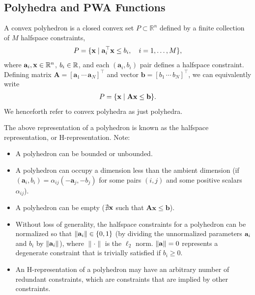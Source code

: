 \subsection{Polyhedra and PWA Functions}
\begin{definition}
A convex polyhedron is a closed convex set $P \subset \mathbb{R}^n$ defined by a finite collection of $M$ halfspace constraints,
\[
P = \{\mathbf{x} \mid \mathbf{a}_i^\top \mathbf{x} \le b_i, \quad i = 1, \ldots, M\},
\]
where $\mathbf{a}_i,\mathbf{x} \in \mathbb{R}^n$, $b_i \in \mathbb{R}$, and each $(\mathbf{a}_i, b_i)$ pair defines a halfspace constraint. Defining matrix $\mathbf{A} = [\mathbf{a}_1 \, \cdots \, \mathbf{a}_N]^\top$ and vector $\mathbf{b} = [b_1 \, \cdots \, b_N]^\top$, we can equivalently write
\begin{align*}
    P = \{\mathbf{x} \mid \mathbf{Ax} \le \mathbf{b} \}. 
\end{align*}
We henceforth refer to convex polyhedra as just polyhedra. 
\end{definition}

The above representation of a polyhedron is known as the halfspace representation, or H-representation. 
Note:
\begin{itemize}
\item A polyhedron can be bounded or unbounded.
\item A polyhedron can occupy a dimension less than the ambient dimension (if $(\mathbf{a}_i, b_i) = \alpha_{ij}(-\mathbf{a}_j, -b_j)$ for some pairs $(i,j)$ and some positive scalars $\alpha_{ij}$).
\item A polyhedron can be empty ($\nexists \mathbf{x}$ such that $\mathbf{Ax} \le \mathbf{b}$).
\item Without loss of generality, the halfspace constraints for a polyhedron can be normalized so that $\|\mathbf{a}_i\|\in \{0,1\}$ (by dividing the unnormalized parameters $\mathbf{a}_i$ and $b_i$ by $\|\mathbf{a}_i\|$), where $\|\cdot\|$ is the $\ell_2$ norm. $\|\mathbf{a}\| = 0$ represents a degenerate constraint that is trivially satisfied if $b_i \ge 0$.
\item An H-representation of a polyhedron may have an arbitrary number of redundant constraints, which are constraints that are implied by other constraints. 
\end{itemize}

